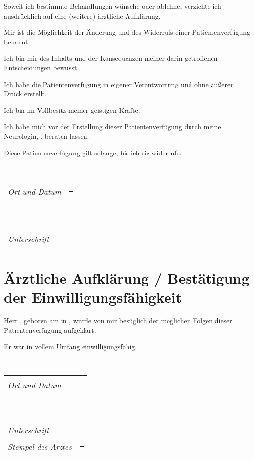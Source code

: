 \documentclass[pdftex,12pt,a4paper]{article}
\begin{document}
Soweit ich bestimmte Behandlungen wünsche oder ablehne, verzichte ich ausdrücklich auf eine (weitere) ärztliche 
Aufklärung.

Mir ist die Möglichkeit der Änderung und des Widerrufs einer Patientenverfügung bekannt.

Ich bin mir des Inhalts und der Konsequenzen meiner darin getroffenen Entscheidungen bewusst.

Ich habe die Patientenverfügung in eigener Verantwortung und ohne äußeren Druck erstellt.

Ich bin im Vollbesitz meiner geistigen Kräfte.


Ich habe mich vor der Erstellung dieser Patientenverfügung durch meine
Neurologin, \mytrustedthree, beraten lassen.



Diese Patientenverfügung gilt solange, bis ich sie widerrufe.

~

\begin{tabular}{ll}

\textit{Ort und Datum} & \rule[-0.2cm]{10cm}{.3mm} \\

~  & ~ \\

~ & ~ \\

\textit{Unterschrift} &  \rule[-0.2cm]{10cm}{.3mm} \\

\end{tabular}



\section{Ärztliche Aufklärung / Bestätigung der Einwilligungsfähigkeit}

Herr \myfullname, geboren am \mybirthday in \myplaceofbirth, 
wurde von mir bezüglich der möglichen Folgen dieser Patientenverfügung aufgeklärt.

Er war in vollem Umfang einwilligungsfähig.

~

\begin{tabular}{ll}

\textit{Ort und Datum} & \rule[-0.2cm]{10cm}{.3mm} \\

~  & ~ \\

~ & ~ \\

\textit{Unterschrift} & \\

\textit{Stempel des Arztes} & \rule[-0.2cm]{10cm}{.3mm} \\

\end{tabular}
\end{document}
